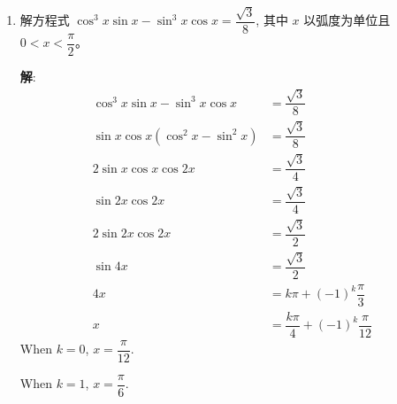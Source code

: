 \documentclass{report}
\newcommand{\sol}{\vspace{0.2cm}\textbf{解}:}
\begin{document}
\begin{enumerate}[leftmargin=*]
    \sol{}
    \begin{align*}
        \sin ^4 \theta+\sin ^2 \theta \cos ^2 \theta+\cos ^4 \theta &\leq \dfrac{3}{4} \\
        \sin^2\theta(\sin^2\theta + \cos^2\theta) + \cos^4\theta &\leq \dfrac{3}{4}\\
        \sin^2\theta + \cos^4\theta &\leq \dfrac{3}{4}\\
        1 - \cos^2\theta + \cos^4\theta &\leq \dfrac{3}{4}\\
        \cos^4\theta - \cos^2\theta + \dfrac{1}{4} &\leq 0\\
        \left(\cos^2\theta - \dfrac{1}{2}\right)^2 &\leq 0\\
        \cos^2\theta &= \dfrac{1}{2}\\
        \theta &= k\pi \pm \dfrac{\pi}{4}
    \end{align*}
    When $k = 0$, $\theta = \dfrac{\pi}{4}$ or $\theta = -\dfrac{\pi}{4}$.

    When $k = 1$, $\theta = \dfrac{5\pi}{4}$ or $\theta = \dfrac{3\pi}{4}$.

    When $k = 2$, $\theta = \dfrac{9\pi}{4}$ or $\theta = \dfrac{7\pi}{4}$.

    Since $0 \leq \theta \leq 2\pi$, the solutions are $\dfrac{\pi}{4}, \dfrac{3\pi}{4}, \dfrac{5\pi}{4}, \dfrac{7\pi}{4}$. \hfill $\blacksquare$

    \item 解方程式 $\cos ^3 x \sin x-\sin ^3 x \cos x=\dfrac{\sqrt{3}}{8}$, 其中 $x$ 以弧度为单位且 $0<x<\dfrac{\pi}{2}$。
    
    \sol{}
    \begin{align*}
        \cos ^3 x \sin x-\sin ^3 x \cos x &= \dfrac{\sqrt{3}}{8}\\
        \sin x \cos x(\cos^2 x - \sin^2 x) &= \dfrac{\sqrt{3}}{8}\\
        2\sin x \cos x\cos 2x &= \dfrac{\sqrt{3}}{4}\\
        \sin 2x\cos 2x &= \dfrac{\sqrt{3}}{4}\\
        2\sin 2x\cos 2x &= \dfrac{\sqrt{3}}{2}\\
        \sin 4x &= \dfrac{\sqrt{3}}{2}\\
        4x &= k\pi + (-1)^k\dfrac{\pi}{3}\\
        x &= \dfrac{k\pi}{4} + (-1)^k\dfrac{\pi}{12}
    \end{align*}
    When $k = 0$, $x = \dfrac{\pi}{12}$.

    When $k = 1$, $x = \dfrac{\pi}{6}$.


\end{enumerate}
\end{document}
